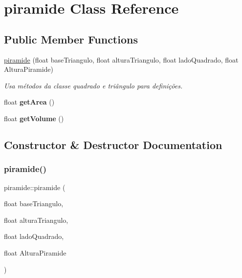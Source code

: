\hypertarget{classpiramide}{}\section{piramide Class Reference}
\label{classpiramide}
\subsection*{Public Member Functions}
\begin{DoxyCompactItemize}
\item 
\mbox{\hyperlink{classpiramide_a095873f62dcf579692142be456c1bbb6}{piramide}} (float base\+Triangulo, float altura\+Triangulo, float lado\+Quadrado, float Altura\+Piramide)
\begin{DoxyCompactList}\small\item\em Usa métodos da classe quadrado e triângulo para definições. \end{DoxyCompactList}\item 
\mbox{\label{classpiramide_a1ca04b666b157a3e5c74206e7eacc5ed}} 
float {\bfseries get\+Area} ()
\item 
\mbox{\label{classpiramide_ad003a47e0de28eb2ae2b7ff638460e1b}} 
float {\bfseries get\+Volume} ()
\end{DoxyCompactItemize}


\subsection{Constructor \& Destructor Documentation}
\mbox{\label{classpiramide_a095873f62dcf579692142be456c1bbb6}} 
\subsubsection{\texorpdfstring{piramide()}{piramide()}}
{\footnotesize\ttfamily piramide\+::piramide (\begin{DoxyParamCaption}\item[{float}]{base\+Triangulo,  }\item[{float}]{altura\+Triangulo,  }\item[{float}]{lado\+Quadrado,  }\item[{float}]{Altura\+Piramide }\end{DoxyParamCaption})}



